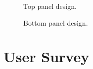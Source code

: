 \documentclass[12pt]{article}
\numberwithin{subsubsubsection}{subsubsection}
\begin{document}
\begin{figure}[H]
    \centering
    \caption{Top panel design.}
    \label{fig:top_panel}
\end{figure}

\begin{figure}[H]
    \centering
    \caption{Bottom panel design.}
    \label{fig:bottom_panel}
\end{figure}


\newpage

\section{User Survey}
\label{appendix:survey}
\end{document}
